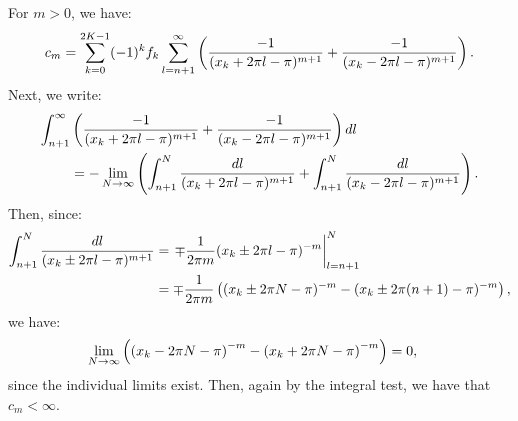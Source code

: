 \documentclass{article}
\begin{document}
For $m>0$, we have:
\begin{align*}
  c_m = \sum_{k=0}^{2K-1} (-1)^k f_k \sum_{l = n+1}^\infty \left(\frac{-1}{(x_k + 2\pi l - \pi)^{m+1}} + \frac{-1}{(x_k - 2\pi l - \pi)^{m+1}}\right).
\end{align*}
Next, we write:
\begin{align*}
  \int_{n+1}^\infty &\left(\frac{-1}{(x_k + 2\pi l - \pi)^{m+1}} + \frac{-1}{(x_k - 2\pi l - \pi)^{m+1}}\right) dl \\
  &= -\lim_{N \to \infty} \left(\int_{n+1}^N \frac{dl}{(x_k + 2\pi l - \pi)^{m+1}} + \int_{n+1}^N \frac{dl}{(x_k - 2\pi l - \pi)^{m+1}}\right).
\end{align*}
Then, since:
\begin{align*}
  \int_{n+1}^N \frac{dl}{(x_k \pm 2 \pi l - \pi)^{m+1}} &= \left. \mp \frac{1}{2 \pi m} (x_k \pm 2 \pi l - \pi)^{-m} \right|_{l=n+1}^N \\
  &= \mp \frac{1}{2\pi m} \left((x_k \pm 2 \pi N - \pi)^{-m} - (x_k \pm 2 \pi (n+1) - \pi)^{-m}\right),
\end{align*}
we have:
\begin{align*}
  \lim_{N\to\infty} \left(\left(x_k - 2\pi N - \pi\right)^{-m} - \left(x_k + 2\pi N - \pi\right)^{-m}\right) &= 0,
\end{align*}
since the individual limits exist. Then, again by the integral test,
we have that $c_m < \infty$.
\end{document}
